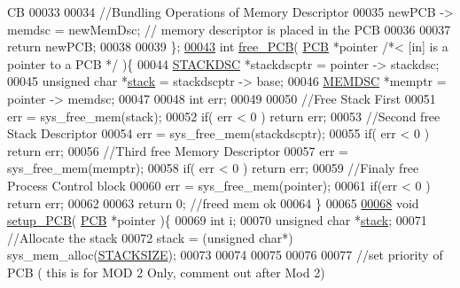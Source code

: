 \begin{DoxyCode}
{      CB}
00033         
00034         \textcolor{comment}{//Bundling Operations of Memory Descriptor }
00035         newPCB -> memdsc = newMemDsc; \textcolor{comment}{// memory descriptor is placed in the PCB}
00036         
00037         \textcolor{keywordflow}{return} newPCB;
00038         
00039 \};
\hypertarget{mpx__r2_8c_source_l00043}{}\hyperlink{mpx__r2_8h_a79890f055b1d0fccf1962bbde4877caa}{00043} \textcolor{keywordtype}{int} \hyperlink{mpx__r2_8c_a79890f055b1d0fccf1962bbde4877caa}{free_PCB}( \hyperlink{structprocess}{PCB} *pointer \textcolor{comment}{/*< [in] is a pointer to a PCB  */} )\{
00044         \hyperlink{structstack}{STACKDSC} *stackdscptr = pointer -> stackdsc;
00045         \textcolor{keywordtype}{unsigned} \textcolor{keywordtype}{char} *\hyperlink{structstack}{stack} = stackdscptr -> base;
00046         \hyperlink{structmem}{MEMDSC} *memptr = pointer -> memdsc;
00047         
00048         \textcolor{keywordtype}{int} err;
00049         
00050         \textcolor{comment}{//Free Stack First}
00051         err = sys\_free\_mem(stack);
00052         \textcolor{keywordflow}{if}( err < 0 ) \textcolor{keywordflow}{return} err;
00053         \textcolor{comment}{//Second free Stack Descriptor}
00054         err = sys\_free\_mem(stackdscptr);
00055         \textcolor{keywordflow}{if}( err < 0 ) \textcolor{keywordflow}{return} err;
00056         \textcolor{comment}{//Third free Memory Descriptor}
00057         err = sys\_free\_mem(memptr);
00058         \textcolor{keywordflow}{if}( err < 0 ) \textcolor{keywordflow}{return} err;
00059         \textcolor{comment}{//Finaly free Process Control block}
00060         err = sys\_free\_mem(pointer);
00061         \textcolor{keywordflow}{if}(err < 0 ) \textcolor{keywordflow}{return} err;
00062         
00063         \textcolor{keywordflow}{return} 0; \textcolor{comment}{//freed mem ok}
00064 \}
00065 
\hypertarget{mpx__r2_8c_source_l00068}{}\hyperlink{mpx__r2_8h_a20991a79e940fd54095a05f5b25cfaf3}{00068} \textcolor{keywordtype}{void} \hyperlink{mpx__r2_8c_a20991a79e940fd54095a05f5b25cfaf3}{setup_PCB}( \hyperlink{structprocess}{PCB} *pointer )\{
00069         \textcolor{keywordtype}{int} i;
00070         \textcolor{keywordtype}{unsigned} \textcolor{keywordtype}{char} *\hyperlink{structstack}{stack};
00071         \textcolor{comment}{//Allocate the stack}
00072         stack = (\textcolor{keywordtype}{unsigned} \textcolor{keywordtype}{char}*) sys\_mem\_alloc(\hyperlink{mpx__r2_8h_a21d9543c516fffee84a7963224271f95}{STACKSIZE});
00073         
00074         
00075                 
00076                 
00077         \textcolor{comment}{//set priority of PCB ( this is for MOD 2 Only, comment out after Mod 2) 
}
\end{DoxyCode}
